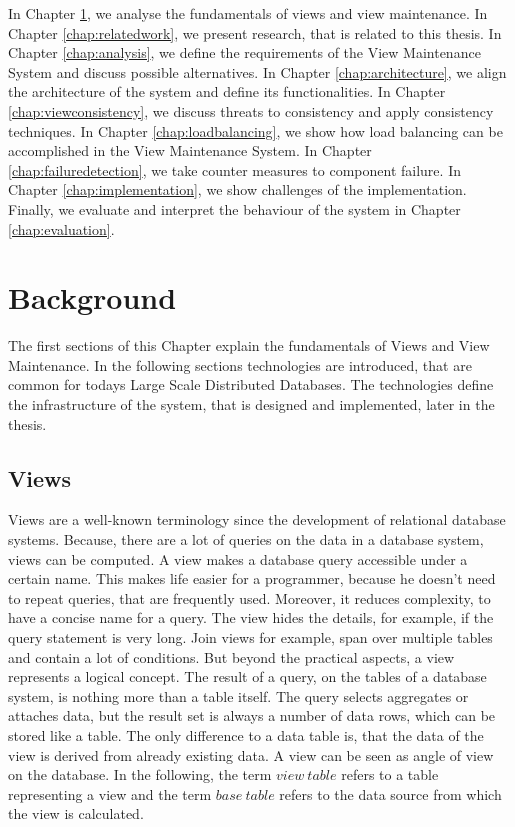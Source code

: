 \documentclass[11pt,a4paper,bibtotoc,idxtotoc,headsepline,footsepline,footexclude,BCOR12mm,DIV13]{scrbook}
\begin{document}
In Chapter \ref{chap:background}, we analyse the fundamentals of views and view maintenance. In Chapter \ref{chap:relatedwork}, we present research, that is related to this thesis. In Chapter \ref{chap:analysis}, we define the requirements of the View Maintenance System and discuss possible alternatives.  In Chapter \ref{chap:architecture}, we align the architecture of the system and define its functionalities. In Chapter \ref{chap:viewconsistency}, we discuss threats to consistency and apply consistency techniques. In Chapter \ref{chap:loadbalancing}, we show how load balancing can be accomplished in the View Maintenance System. In Chapter \ref{chap:failuredetection}, we take counter measures to component failure. In Chapter \ref{chap:implementation}, we show challenges of the implementation. Finally, we evaluate and interpret the behaviour of the system in Chapter \ref{chap:evaluation}.\\


\chapter{Background}
\label{chap:background}

The first sections of this Chapter explain the fundamentals of Views and View Maintenance. In the following sections technologies are introduced, that are common for todays Large Scale Distributed Databases. The technologies define the infrastructure of the system, that is designed and implemented, later in the thesis. 

\section{Views}
Views are a well-known terminology since the development of relational database systems. Because, there are a lot of queries on the data in a database system, views can be computed. A view makes a database query accessible under a certain name.  This makes life easier for a programmer, because he doesn't need to repeat queries, that are frequently used. Moreover, it reduces complexity, to have a concise name for a query. The view hides the details, for example, if the query statement is very long. Join views for example, span over multiple tables and contain a lot of conditions.
But beyond the practical aspects, a view represents a logical concept.  The result of a query, on the tables of a database system, is nothing more than a table itself. The query selects aggregates or attaches data, but the result set is always a number of data rows, which can be stored like a table. The only difference to a data table is, that the data of the view is derived from already existing data.  A view can be seen as angle of view on the database. In the following, the term $view\:table$ refers to a table representing a view and the term $base\:table$ refers to the data source from which the view is calculated. 
\end{document}
